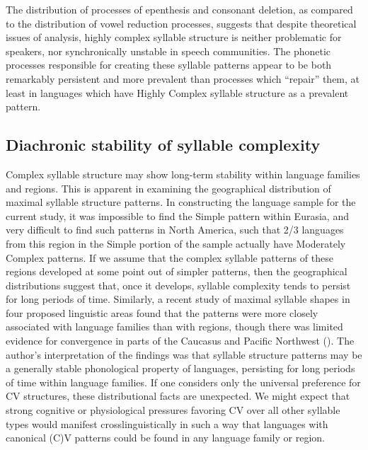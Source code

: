   The distribution of processes of epenthesis and consonant deletion, as compared to the distribution of vowel reduction processes, suggests that despite theoretical issues of analysis, highly complex syllable structure is neither problematic for speakers, nor synchronically unstable in speech communities. The phonetic processes responsible for creating these syllable patterns appear to be both remarkably persistent and more prevalent than processes which ``repair'' them, at least in languages which have Highly Complex syllable structure as a prevalent pattern.

\subsection{Diachronic stability of syllable complexity}\label{sec:8.5.2}

  Complex syllable structure may show long-term stability within language families and regions. This is apparent in examining the geographical distribution of maximal syllable structure patterns. In constructing the language sample for the current study, it was impossible to find the Simple pattern within Eurasia, and very difficult to find such patterns in North America, such that 2/3 languages from this region in the Simple portion of the sample actually have Moderately Complex patterns. If we assume that the complex syllable patterns of these regions developed at some point out of simpler patterns, then the geographical distributions suggest that, once it develops, syllable complexity tends to persist for long periods of time. Similarly, a recent study of maximal syllable shapes in four proposed linguistic areas found that the patterns were more closely associated with language families than with regions, though there was limited evidence for convergence in parts of the Caucasus and Pacific Northwest (\citealt{NapoleãodeSouza2017}). The author’s interpretation of the findings was that syllable structure patterns may be a generally stable phonological property of languages, persisting for long periods of time within language families. If one considers only the universal preference for CV structures, these distributional facts are unexpected. We might expect that strong cognitive or physiological pressures favoring CV over all other syllable types would manifest crosslinguistically in such a way that languages with canonical (C)V patterns could be found in any language family or region.

